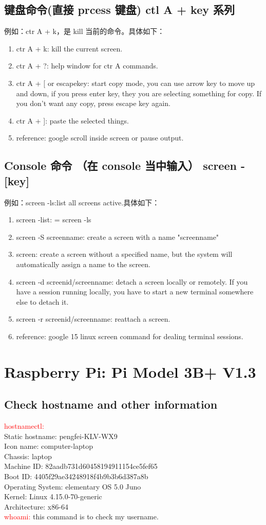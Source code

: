 \documentclass[UTF8,fancyhdr,a4paper]{ctexart}
\begin{document}
\subsection{键盘命令(直接 prcess 键盘) ctl A + key 系列}
例如：ctr A + k，是 kill 当前的命令。具体如下：
\begin{enumerate}
\item ctr A + k: kill the current screen.
\item ctr A + ?: help window for ctr A commands.
\item ctr A + [ or escapekey: start copy mode, you can use arrow key to move up and down, if you press enter key, they you are selecting something for copy. If you don't want any copy, press escape key again.
\item ctr A + ]: paste the selected things.
\item reference: google scroll inside screen or pause output.
\end{enumerate}
\subsection{Console 命令 （在 console 当中输入） screen -[key]}
例如：screen -ls:list all screens active.具体如下：
\begin{enumerate}
\item screen -list: = screen -ls
\item screen -S screenname: create a screen with a name "screenname"
\item screen: create a screen without a specified name, but the system will automatically assign a name to the screen.
\item screen -d screenid/screenname: detach a screen locally or remotely. If you have a session running locally, you have to start a new terminal somewhere else to detach it.
\item screen -r screenid/screenname: reattach a screen.
\item reference: google 15 linux screen command for dealing terminal sessions.
\end{enumerate}

\section{Raspberry Pi: Pi Model 3B+ V1.3}
\subsection{Check hostname and other information}
\textcolor{red}{hostnamectl:}\\
   Static hostname: pengfei-KLV-WX9\\
         Icon name: computer-laptop\\
           Chassis: laptop\\
        Machine ID: 82aadb731d60458194911154ce5fef65\\
           Boot ID: 4405f29ae34248918f4b9b3b6d387a8b\\
  Operating System: elementary OS 5.0 Juno\\
            Kernel: Linux 4.15.0-70-generic\\
      Architecture: x86-64\\
\textcolor{red}{whoami:} this command is to check my username.
\end{document}
